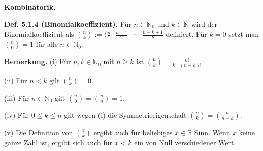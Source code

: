 \textbf{Kombinatorik.}

\textbf{Def. 5.1.4 (Binomialkoeffizient).} Für $n \in \mathbb N_0$ und $k \in \mathbb N$ wird der Binomialkoeffizient als $\binom{n}{k} := ( \frac{n}{1} \cdot \frac{n-1}{2} \cdot \cdots \cdot \frac{n-k+1}{k}$ definiert. Für $k=0$ setzt man $\binom{n}{0} = 1$ für alle $n \in \mathbb N_0$. 

\textbf{Bemerkung.} (i) Für $n,k \in \mathbb N_0$ mit $n \geq k$ ist $\binom{n}{k} = \frac{n!}{k!\cdot (n-k)!}$.

(ii) Für $n<k$ gilt $\binom{n}{k} = 0$.

(iii) Für $n \in \mathbb N_0$ gilt $\binom{n}{0} = \binom{n}{n} = 1$.

(iv) Für $0 \leq k \leq n$ gilt wegen (i) die Symmetrieeigenschaft $\binom{n}{k} = \binom{n}{n-k}$.

(v) Die Definition von $\binom{x}{k}$ ergibt auch für beliebiges $x\in \mathbb R$ Sinn. Wenn $x$ keine ganze Zahl ist, ergibt sich auch für $x<k$ ein von Null verschiedener Wert.

